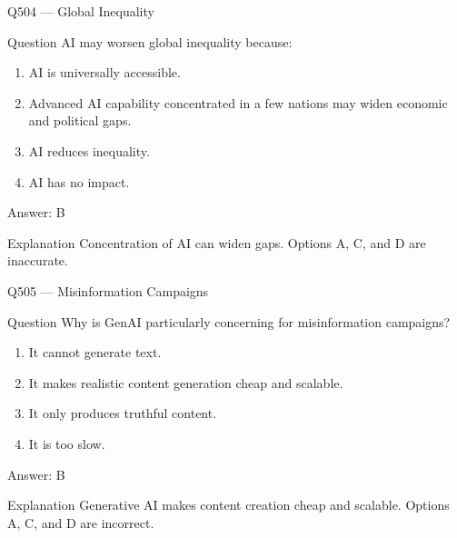 \documentclass[aspectratio=169,8pt]{beamer}
\begin{document}
	\begin{frame}{Q504 --- Global Inequality}
		\begin{block}{Question}
			AI may worsen global inequality because:
			\begin{enumerate}
				\item AI is universally accessible.
				\item Advanced AI capability concentrated in a few nations may widen economic and political gaps.
				\item AI reduces inequality.
				\item AI has no impact.
			\end{enumerate}
		\end{block}
		\begin{exampleblock}{Answer: B}\end{exampleblock}
		\begin{block}{Explanation}
			Concentration of AI can widen gaps. Options A, C, and D are inaccurate.
		\end{block}
	\end{frame}
	
	\begin{frame}{Q505 --- Misinformation Campaigns}
		\begin{block}{Question}
			Why is GenAI particularly concerning for misinformation campaigns?
			\begin{enumerate}
				\item It cannot generate text.
				\item It makes realistic content generation cheap and scalable.
				\item It only produces truthful content.
				\item It is too slow.
			\end{enumerate}
		\end{block}
		\begin{exampleblock}{Answer: B}\end{exampleblock}
		\begin{block}{Explanation}
			Generative AI makes content creation cheap and scalable. Options A, C, and D are incorrect.
		\end{block}
	\end{frame}
	
\end{document}
